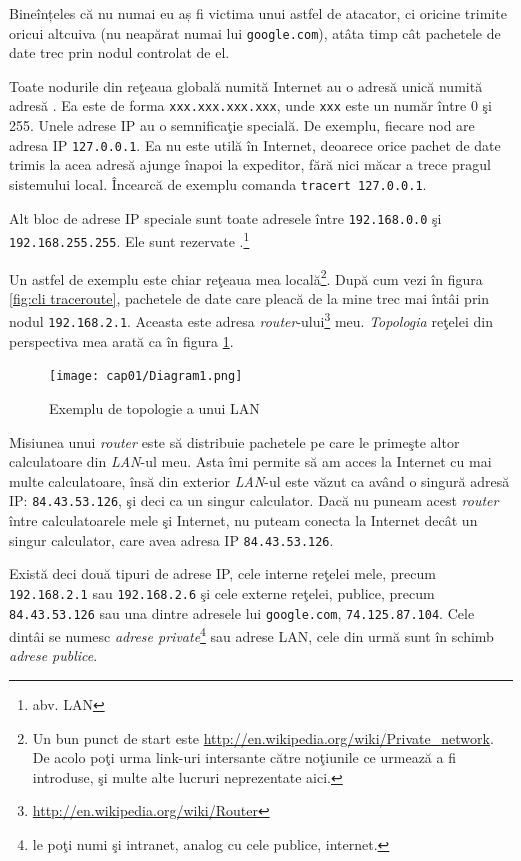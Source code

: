 Bineînțeles că nu numai eu aș fi
victima unui astfel de atacator, ci oricine trimite 
oricui altcuiva (nu neapărat numai lui \texttt{google.com}), atâta timp cât pachetele
de date trec prin nodul controlat de el.

Toate nodurile din reţeaua globală numită Internet au o adresă unică numită adresă
. Ea este de forma \texttt{xxx.xxx.xxx.xxx}, unde \texttt{xxx} este un număr
între 0 şi 255. Unele adrese IP au o semnificaţie specială. De exemplu, fiecare
nod are adresa IP \texttt{127.0.0.1}. Ea nu este utilă în Internet, deoarece orice pachet
de date trimis la acea adresă ajunge înapoi la expeditor, fără nici măcar a trece
pragul sistemului local. Încearcă de exemplu comanda \texttt{tracert 127.0.0.1}.

Alt bloc de adrese IP speciale sunt toate adresele între \texttt{192.168.0.0} şi
\texttt{192.168.255.255}. Ele sunt rezervate .\footnote{abv. LAN}

Un astfel de exemplu este chiar reţeaua mea
locală\footnote{Un bun punct de start este \url{http://en.wikipedia.org/wiki/Private_network}.
De acolo poţi urma link-uri intersante către noţiunile ce urmează a fi introduse,
şi multe alte lucruri neprezentate aici.}.
După cum vezi în figura \ref{fig:cli traceroute},
pachetele de date care pleacă de la mine trec mai întâi prin nodul \texttt{192.168.2.1}.
Aceasta este adresa \textsl{router}-ului\footnote{\url{http://en.wikipedia.org/wiki/Router}}
meu. \textsl{Topologia} reţelei din perspectiva mea
arată ca în figura \ref{fig:topologie}.

\begin{figure}[h]
  \centering
    \texttt{[image: cap01/Diagram1.png]}
  \caption{Exemplu de topologie a unui LAN}
  \label{fig:topologie}
\end{figure}

Misiunea unui \textsl{router} este să distribuie pachetele
pe care le primeşte altor calculatoare din \textsl{LAN}-ul meu. Asta îmi permite să am acces
la Internet cu mai multe calculatoare, însă din exterior \textsl{LAN}-ul este văzut ca
având o singură adresă IP: \texttt{84.43.53.126}, şi deci ca un singur calculator. Dacă
nu puneam acest \textsl{router} între calculatoarele mele şi Internet, nu puteam conecta
la Internet decât un singur calculator, care avea adresa IP \texttt{84.43.53.126}.

\sloppy Există deci două tipuri de adrese IP, cele interne reţelei mele, precum \texttt{192.168.2.1}
sau \texttt{192.168.2.6} şi cele externe reţelei, publice, precum \texttt{84.43.53.126} sau una
dintre adresele lui \texttt{google.com}, \texttt{74.125.87.104}.
Cele dintâi se numesc \textsl{adrese private}\footnote{le poţi numi şi {\glqq}intranet{\grqq},
analog cu cele publice, {\glqq}internet{\grqq}.}
sau adrese LAN, cele din urmă sunt în schimb \textsl{adrese publice}.

